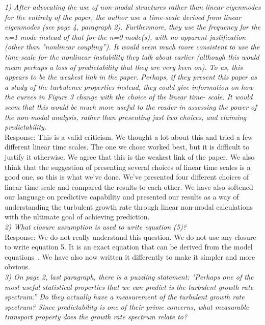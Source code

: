 \documentclass[12pt]{article}
\begin{document}
\emph{1) After advocating the use of non-modal structures rather than linear eigenmodes for the
entirety of the paper, the author use a time-scale derived from linear eigenmodes (see
page 4, paragraph 2). Furthermore, they use the frequency for the n=1 mode instead of
that for the n=0 mode(s), with no apparent justification (other than "nonlinear coupling”).
It would seem much more consistent to use the time-scale for the nonlinear instability
they talk about earlier (although this would mean perhaps a loss of predictability that they
are very keen on). To us, this appears to be the weakest link in the paper. Perhaps, if they
present this paper as a study of the turbulence properties instead, they could give
information on how the curves in Figure 3 change with the choice of the linear time-
scale. It would seem that this would be much more useful to the reader in assessing the
power of the non-modal analysis, rather than presenting just two choices, and claiming
predictability. } \\

Response: This is a valid criticism. We thought a lot about this and tried a few different linear time scales. The one we chose worked best, but it is difficult to justify it otherwise.
We agree that this is the weakest link of the paper. We also think that the suggestion of presenting several choices of linear time scales is a good one, so this is what we've done.
We've presented four different choices of linear time scale and compared the results to each other. We have also softened our language on predictive capability and presented our results
as a way of understanding the turbulent growth rate through linear non-modal calculations with the ultimate goal of achieving prediction. \\


\emph{2) What closure assumption is used to write equation (5)?} \\


Response: We do not really understand this question. We do not use any closure to write equation 5. It is an exact equation that can be derived from the model equations~\cite{friedman2012b,friedman2013}. 
We have also now written it differently to make it simpler and more obvious. \\


\emph{3) On page 2, last paragraph, there is a puzzling statement: "Perhaps one of the most
useful statistical properties that we can predict is the turbulent growth rate spectrum.” Do
they actually have a measurement of the turbulent growth rate spectrum? Since
predictability is one of their prime concerns, what measurable transport property does the
growth rate spectrum relate to?} \\
\end{document}
